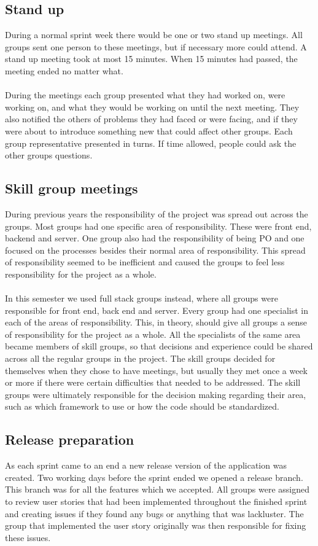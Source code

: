 \subsection{Stand up}
During a normal sprint week there would be one or two stand up meetings.
All groups sent one person to these meetings, but if necessary more could attend.
A stand up meeting took at most 15 minutes.
When 15 minutes had passed, the meeting ended no matter what.
\\
\\
During the meetings each group presented what they had worked on, were working on, and what they would be working on until the next meeting.
They also notified the others of problems they had faced or were facing, and if they were about to introduce something new that could affect other groups.
Each group representative presented in turns. 
If time allowed, people could ask the other groups questions.

\subsection{Skill group meetings}
During previous years the responsibility of the project was spread out across the groups.
Most groups had one specific area of responsibility.
These were front end, backend and server.
One group also had the responsibility of being PO and one focused on the processes besides their normal area of responsibility.
This spread of responsibility seemed to be inefficient and caused the groups to feel less responsibility for the project as a whole.
\\\\
In this semester we used full stack groups instead, where all groups were responsible for front end, back end and server.
Every group had one specialist in each of the areas of responsibility.
This, in theory, should give all groups a sense of responsibility for the project as a whole.
All the specialists of the same area became members of skill groups, so that decisions and experience could be shared across all the regular groups in the project.
The skill groups decided for themselves when they chose to have meetings, but usually they met once a week or more if there were certain difficulties that needed to be addressed.
The skill groups were ultimately responsible for the decision making regarding their area, such as which framework to use or how the code should be standardized.

\subsection{Release preparation}
As each sprint came to an end a new release version of the application was created.
Two working days before the sprint ended we opened a release branch.
This branch was for all the features which we accepted.
All groups were assigned to review user stories that had been implemented throughout the finished sprint and creating issues if they found any bugs or anything that was lackluster.
The group that implemented the user story originally was then responsible for fixing these issues.

